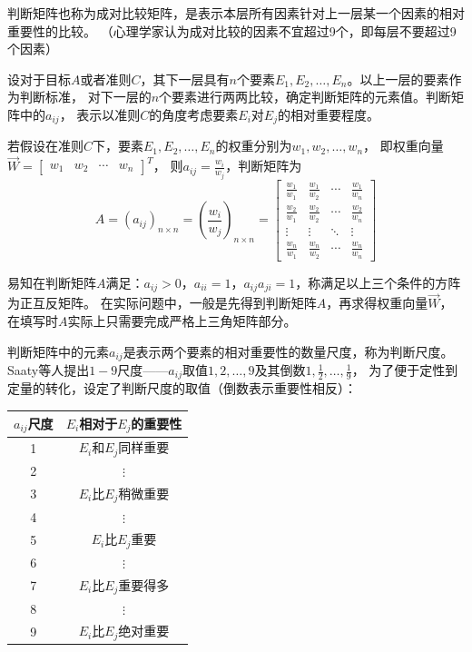 \documentclass[a4paper,12pt]{article}
\begin{document}
判断矩阵也称为成对比较矩阵，是表示本层所有因素针对上一层某一个因素的相对重要性的比较。
（心理学家认为成对比较的因素不宜超过9个，即每层不要超过9个因素）

设对于目标$A$或者准则$C$，其下一层具有$n$个要素$E_1,E_2,\dots,E_n$。以上一层的要素作为判断标准，
对下一层的$n$个要素进行两两比较，确定判断矩阵的元素值。判断矩阵中的$a_{ij}$，
表示以准则$C$的角度考虑要素$E_i$对$E_j$的相对重要程度。

若假设在准则$C$下，要素$E_1,E_2,\dots,E_n$的权重分别为$w_1,w_2,\dots,w_n$，
即权重向量$\overrightarrow W=\begin{bmatrix} w_1 & w_2 & \cdots & w_n\end{bmatrix}^T$，
则$a_{ij}=\frac{w_i}{w_j}$，判断矩阵为
$$
A=\left(a_{ij}\right)_{n\times n}=\left(\frac{w_i}{w_j}\right)_{n\times n}=
\begin{bmatrix}
    \frac{w_1}{w_1} & \frac{w_1}{w_2} & \cdots & \frac{w_1}{w_n} \\
    \frac{w_2}{w_1} & \frac{w_2}{w_2} & \cdots & \frac{w_2}{w_n} \\
    \vdots          & \vdots          & \ddots & \vdots          \\
    \frac{w_n}{w_1} & \frac{w_n}{w_2} & \cdots & \frac{w_n}{w_n}
\end{bmatrix}
$$

易知在判断矩阵$A$满足：$a_{ij}>0$，$a_{ii}=1$，$a_{ij}a_{ji}=1$，称满足以上三个条件的方阵为正互反矩阵。
在实际问题中，一般是先得到判断矩阵$A$，再求得权重向量$\overrightarrow W$，在填写时$A$实际上只需要完成严格上三角矩阵部分。

判断矩阵中的元素$a_{ij}$是表示两个要素的相对重要性的数量尺度，称为判断尺度。
Saaty等人提出$1-9$尺度——$a_{ij}$取值$1,2,\dots,9$及其倒数$1,\frac12,\dots,\frac19$，
为了便于定性到定量的转化，设定了判断尺度的取值（倒数表示重要性相反）：
\begin{center}
    \begin{tabular}{|c|c|}
        \hline
        $a_{ij}$尺度 & $E_i$相对于$E_j$的重要性 \\ \hline
        1 & $E_i$和$E_j$同样重要 \\ \hline
        2 & $\vdots$ \\ \hline
        3 & $E_i$比$E_j$稍微重要 \\ \hline
        4 & $\vdots$ \\ \hline
        5 & $E_i$比$E_j$重要 \\ \hline
        6 & $\vdots$ \\ \hline
        7 & $E_i$比$E_j$重要得多 \\ \hline
        8 & $\vdots$ \\ \hline
        9 & $E_i$比$E_j$绝对重要 \\ \hline
    \end{tabular}
\end{center}
\end{document}
